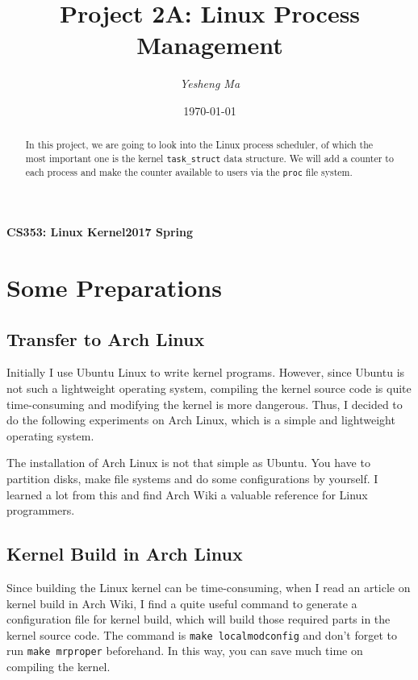 \documentclass{article}
\begin{document}
\title{Project 2A: Linux Process Management}
\author{\textit{Yesheng Ma}}
\date{\today}
{\bf\small CS353: Linux Kernel}\hfill{\bf\small 2017 Spring}
{\let\newpage\relax\maketitle}
\maketitle


\begin{abstract}
In this project, we are going to look into the Linux process scheduler, of which the most important one is the kernel {\tt task\_struct} data structure. We will add a counter to each process and make the counter available to users via the {\tt proc} file system.
\end{abstract}


\section{Some Preparations}
\subsection{Transfer to Arch Linux}
Initially I use Ubuntu Linux to write kernel programs. However, since Ubuntu is not such a lightweight operating system, compiling the kernel source code is quite time-consuming and modifying the kernel is more dangerous. Thus, I decided to do the following experiments on Arch Linux, which is a simple and lightweight operating system.
 
The installation of Arch Linux is not that simple as Ubuntu. You have to partition disks, make file systems and do some configurations by yourself. I learned a lot from this and find Arch Wiki a valuable reference for Linux programmers.

\subsection{Kernel Build in Arch Linux}
Since building the Linux kernel can be time-consuming, when I read an article on kernel build in Arch Wiki, I find a quite useful command to generate a configuration file for kernel build, which will build those required parts in the kernel source code. The command is {\tt make localmodconfig} and don't forget to run {\tt make mrproper} beforehand. In this way, you can save much time on compiling the kernel.
\end{document}
